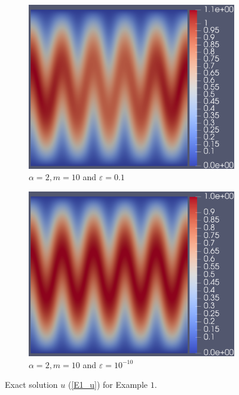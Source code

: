 \documentclass[12pt]{ociamthesis}
\begin{document}
\begin{figure}[H]
\begin{subfigure}{0.44\textwidth}
     \includegraphics[width=\textwidth]{Pics/uf/U_E1c_eps_1.png}
     \caption{$\alpha=2, m=10$ and $\varepsilon = 0.1$}
 \end{subfigure}
 \hfill
 \begin{subfigure}{0.44\textwidth}
     \includegraphics[width=\textwidth]{Pics/uf/u_E1c_eps_10.png}
     \caption{$\alpha=2, m=10$ and $\varepsilon = 10^{-10}$}
 \end{subfigure}
 \caption{Exact solution $u$ (\ref{E1_u}) for Example $1$.} \label{E1_us}
\end{figure}
\end{document}
